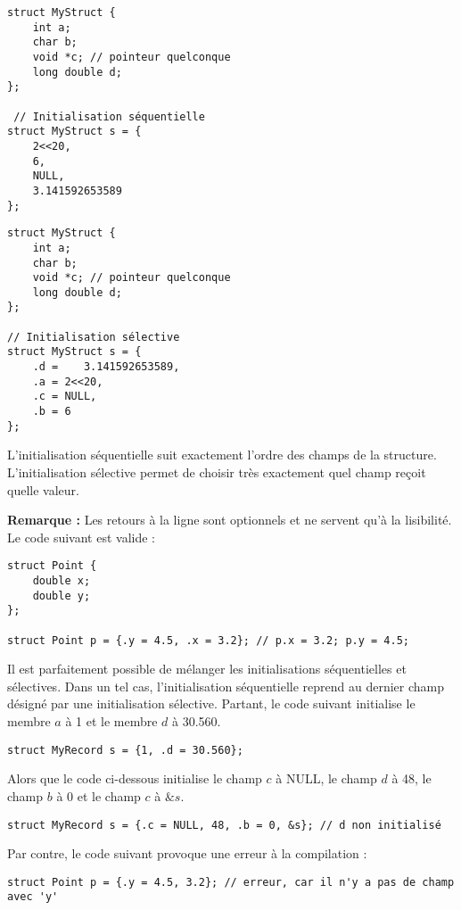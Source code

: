 \documentclass[../../../main.tex]{subfiles}
\begin{document}
\begin{minipage}{0.5\textwidth}
\begin{verbatim}
struct MyStruct {
	int a;
	char b;
	void *c; // pointeur quelconque
	long double d; 
};

 // Initialisation séquentielle
struct MyStruct s = {
	2<<20,
	6,
	NULL,
	3.141592653589
};
\end{verbatim}
\end{minipage}
\begin{minipage}{0.5\textwidth}
\begin{verbatim}
struct MyStruct {
	int a;
	char b;
	void *c; // pointeur quelconque
	long double d;
};

// Initialisation sélective
struct MyStruct s = {
	.d =	3.141592653589,
	.a = 2<<20,
	.c = NULL,
	.b = 6
}; 
\end{verbatim}
\end{minipage}

L'initialisation séquentielle suit exactement l'ordre des champs de la structure.
\newline
L'initialisation sélective permet de choisir très exactement quel champ reçoit quelle valeur.
 
\textbf{Remarque :} Les retours à la ligne sont optionnels et ne servent qu'à la lisibilité. Le code suivant est valide :
\begin{verbatim}
struct Point {
	double x;
	double y;
};

struct Point p = {.y = 4.5, .x = 3.2}; // p.x = 3.2; p.y = 4.5;
\end{verbatim}
Il est parfaitement possible de mélanger les initialisations séquentielles et sélectives. Dans un tel cas, l’initialisation séquentielle reprend au dernier champ désigné par une initialisation sélective. Partant, le code suivant initialise le membre $a$ à 1 et le membre $d$ à 30.560.
\begin{verbatim}
struct MyRecord s = {1, .d = 30.560};
\end{verbatim}
Alors que le code ci-dessous initialise le champ $c$ à \textsf{NULL}, le champ $d$ à 48, le champ $b$ à 0 et le champ $c$ à $\&s$.
\begin{verbatim}
struct MyRecord s = {.c = NULL, 48, .b = 0, &s}; // d non initialisé
\end{verbatim}
Par contre, le code suivant provoque une erreur à la compilation :
\begin{verbatim}
struct Point p = {.y = 4.5, 3.2}; // erreur, car il n'y a pas de champ avec 'y'
\end{verbatim}
\end{document}
